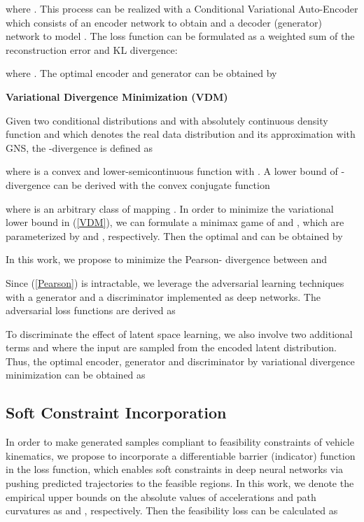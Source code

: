 \documentclass[letterpaper, 10 pt, conference]{ieeeconf}
\begin{document}
where .
This process can be realized with a Conditional Variational Auto-Encoder which consists of an encoder network  to obtain  and a decoder (generator) network  to model .
The loss function can be formulated as a weighted sum of the reconstruction error and KL divergence:


where .
The optimal encoder and generator can be obtained by



\noindent
\textbf{Variational Divergence Minimization (VDM)}

Given two conditional distributions  and  with absolutely continuous density function  and  which denotes the real data distribution and its approximation with GNS, the -divergence \cite{f-divergence} is defined as

where  is a convex and lower-semicontinuous function with . 
A lower bound of -divergence can be derived with the convex conjugate function 

where  is an arbitrary class of mapping .
In order to minimize the variational lower bound in (\ref{VDM}), we can formulate a minimax game of  and , which are parameterized by  and , respectively. Then the optimal  and  can be obtained by 

In this work, we propose to minimize the Pearson- divergence between  and 

Since (\ref{Pearson}) is intractable, we leverage the adversarial learning techniques with a generator  and a discriminator  implemented as deep networks. 
The adversarial loss functions are derived as 


To discriminate the effect of latent space learning, we also involve two additional terms  and  where the input  are sampled from the encoded latent distribution.
Thus, the optimal encoder, generator and discriminator by variational divergence minimization can be obtained as


\subsection{Soft Constraint Incorporation}
In order to make generated samples compliant to feasibility constraints of vehicle kinematics, we propose to incorporate a differentiable barrier (indicator) function  in the loss function, which enables soft constraints in deep neural networks via pushing predicted trajectories to the feasible regions.  
In this work, we denote the empirical upper bounds on the absolute values of accelerations  and path curvatures  as  and , respectively. Then the feasibility loss can be calculated as
\end{document}
